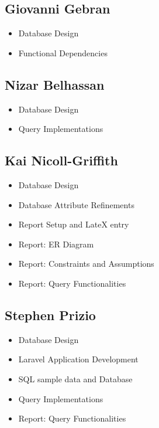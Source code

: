 \documentclass[11pt,letterpaper]{article}
\begin{document}
\subsection{Giovanni Gebran}
 \begin{itemize}
\item Database Design
\item Functional Dependencies
\end{itemize}
\subsection{Nizar Belhassan}
 \begin{itemize}
\item Database Design
\item Query Implementations
\end{itemize}
\subsection{Kai Nicoll-Griffith}
 \begin{itemize}
\item Database Design
\item Database Attribute Refinements
\item Report Setup and LateX entry
\item Report: ER Diagram
\item Report: Constraints and Assumptions
\item Report: Query Functionalities
\end{itemize}
\subsection{Stephen Prizio}
 \begin{itemize}
	\item Database Design
	\item Laravel Application Development
	\item SQL sample data and Database 
	\item Query Implementations
	\item Report: Query Functionalities

\end{itemize}
\end{document}
